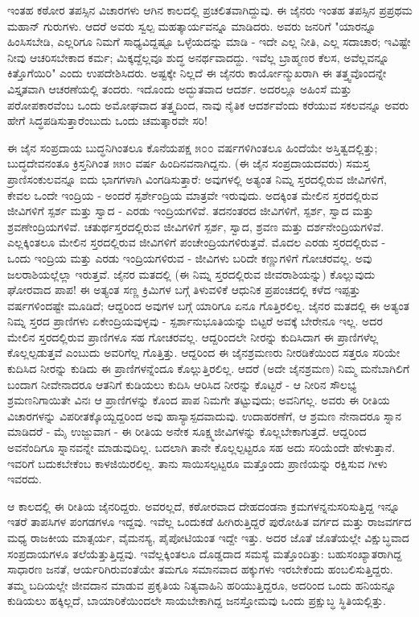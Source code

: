 ಇಂತಹ ಕಠೋರ ತಪಸ್ಸಿನ ವಿಚಾರಗಳು ಆಗಿನ ಕಾಲದಲ್ಲಿ ಪ್ರಚಲಿತವಾಗಿದ್ದುವು. ಈ ಜೈನರು ಇಂತಹ ತಪಸ್ಸಿನ ಪ್ರಪ್ರಥಮ ಮಹಾನ್ ಗುರುಗಳು. ಆದರೆ ಅವರು ಸ್ವಲ್ಪ ಮಹತ್ಕಾರ್ಯವನ್ನೂ ಮಾಡಿದರು. ಅವರು ಜನರಿಗೆ "ಯಾರನ್ನೂ ಹಿಂಸಿಸಬೇಡಿ, ಎಲ್ಲರಿಗೂ ನಿಮಗೆ ಸಾಧ್ಯವಿದ್ದಷ್ಟೂ ಒಳ್ಳೆಯದನ್ನು ಮಾಡಿ - ಇದೇ ಎಲ್ಲ ನೀತಿ, ಎಲ್ಲ ಸದಾಚಾರ; ಇವಿಷ್ಟೇ ನೀವು ಆಚರಿಸಬೇಕಾದ ಕರ್ಮ; ಮಿಕ್ಕದ್ದೆಲ್ಲವೂ ಶುದ್ಧ ಅನರ್ಥವಾದದ್ದು. ಇವೆಲ್ಲ ಬ್ರಾಹ್ಮಣರ ಕೆಲಸ, ಅವೆಲ್ಲವನ್ನೂ ಕಿತ್ತೊಗೆಯಿರಿ" ಎಂದು ಉಪದೇಶಿಸಿದರು. ಅಷ್ಟಕ್ಕೇ ನಿಲ್ಲದೆ ಈ ಜೈನರು ಕಾರ್ಯೋನ್ಮುಖರಾಗಿ ಈ ತತ್ತ್ವವೊಂದನ್ನೇ ವಿಸ್ತೃತವಾಗಿ ಆಚರಣೆಯಲ್ಲಿ ತಂದರು. ಇದೊಂದು ಅದ್ಭುತವಾದ ಆದರ್ಶ. ಅದರಲ್ಲೂ ಅಹಿಂಸೆ ಮತ್ತು ಪರೋಪಕಾರವೆಂಬ ಒಂದು ಅಮೋಘವಾದ ತತ್ತ್ವದಿಂದ, ನಾವು ನೈತಿಕ ಆದರ್ಶವೆಂದು ಕರೆಯುವ ಸಕಲವನ್ನೂ ಅವರು ಹೇಗೆ ಸಿದ್ಧಪಡಿಸುತ್ತಾರೆಂಬುದು ಒಂದು ಚಮತ್ಕಾರವೇ ಸರಿ!

ಈ ಜೈನ ಸಂಪ್ರದಾಯ ಬುದ್ಧನಿಗಿಂತಲೂ ಕೊನೆಯಪಕ್ಷ ೫೦೦ ವರ್ಷಗಳಿಗಿಂತಲೂ ಹಿಂದೆಯೇ ಅಸ್ತಿತ್ವದಲ್ಲಿತ್ತು; ಬುದ್ಧದೇವನಂತೂ ಕ್ರಿಸ್ತನಿಗಿಂತ ೫೫೦ ವರ್ಷ ಹಿಂದಿನವನಾಗಿದ್ದನು. (ಈ ಜೈನ ಸಂಪ್ರದಾಯದವರು) ಸಮಸ್ತ ಪ್ರಾಣಿಸಂಕುಲವನ್ನೂ ಐದು ಭಾಗಗಳಾಗಿ ವಿಂಗಡಿಸುತ್ತಾರೆ: ಅವುಗಳಲ್ಲಿ ಅತ್ಯಂತ ನಿಮ್ನ ಸ್ತರದಲ್ಲಿರುವ ಜೀವಿಗಳಿಗೆ, ಕೇವಲ ಒಂದೇ ಇಂದ್ರಿಯ - ಅಂದರೆ ಸ್ಪರ್ಶೇಂದ್ರಿಯ ಮಾತ್ರವೇ ಇರುವುದು. ಅದಕ್ಕಿಂತ ಮೇಲಿನ ಸ್ತರದಲ್ಲಿರುವ ಜೀವಿಗಳಿಗೆ ಸ್ಪರ್ಶ ಮತ್ತು ಸ್ವಾದ - ಎರಡು ಇಂದ್ರಿಯಗಳಿವೆ. ತದನಂತರದ ಜೀವಿಗಳಿಗೆ, ಸ್ಪರ್ಶ, ಸ್ವಾದ ಮತ್ತು ಶ್ರವಣೇಂದ್ರಿಯಗಳಿವೆ. ಚತುರ್ಥಸ್ತರದಲ್ಲಿರುವ ಜೀವಿಗಳಿಗೆ ಸ್ಪರ್ಶ, ಸ್ವಾದ, ಶ್ರವಣ ಮತ್ತು ದರ್ಶನೇಂದ್ರಿಯಗಳಿವೆ. ಎಲ್ಲಕ್ಕಿಂತಲೂ ಮೇಲಿನ ಸ್ತರದಲ್ಲಿರುವ ಜೀವಿಗಳಿಗೆ ಪಂಚೇಂದ್ರಿಯಗಳಿರುತ್ತವೆ. ಮೊದಲ ಎರಡು ಸ್ತರದಲ್ಲಿರುವ - ಒಂದು ಇಂದ್ರಿಯ ಮತ್ತು ಎರಡು ಇಂದ್ರಿಯಗಳಿರುವ - ಜೀವಿಗಳು ಬರಿದೇ ಕಣ್ಣುಗಳಿಗೆ ಗೋಚರವಲ್ಲ. ಅವು ಜಲರಾಶಿಯಲ್ಲೆಲ್ಲಾ ಇರುತ್ತವೆ. ಜೈನರ ಮತದಲ್ಲಿ (ಈ ನಿಮ್ನ ಸ್ತರದಲ್ಲಿರುವ ಜೀವರಾಶಿಯನ್ನು) ಕೊಲ್ಲುವುದು ಘೋರವಾದ ಪಾಪ! ಈ ಅತ್ಯಂತ ಸಣ್ಣ ಕ್ರಿಮಿಗಳ ಬಗ್ಗೆ ತಿಳುವಳಿಕೆ ಆಧುನಿಕ ಪ್ರಪಂಚದಲ್ಲಿ ಕಳೆದ ಇಪ್ಪತ್ತು ವರ್ಷಗಳಿಂದಷ್ಟೇ ಮೂಡಿದೆ; ಆದ್ದರಿಂದ ಅವುಗಳ ಬಗ್ಗೆ ಯಾರಿಗೂ ಏನೂ ಗೊತ್ತಿರಲಿಲ್ಲ. ಜೈನರ ಮತದಲ್ಲಿ ಈ ಅತ್ಯಂತ ನಿಮ್ನ ಸ್ತರದ ಪ್ರಾಣಿಗಳು ಏಕೇಂದ್ರಿಯವುಳ್ಳವು - ಸ್ಪರ್ಶಾನುಭೂತಿಯನ್ನು ಬಿಟ್ಟರೆ ಅವಕ್ಕೆ ಬೇರೇನೂ ಇಲ್ಲ. ಅದರ ಮೇಲಿನ ಸ್ತರದಲ್ಲಿರುವ ಪ್ರಾಣಿಗಳೂ ಸಹ ಗೋಚರವಲ್ಲ. ಆದ್ದರಿಂದಲೇ ನೀರನ್ನು ಕುದಿಸಿದಾಗ ಈ ಪ್ರಾಣಿಗಳೆಲ್ಲ ಕೊಲ್ಲಲ್ಪಡುತ್ತವೆ ಎಂಬುದು ಅವರಿಗೆಲ್ಲ ಗೊತ್ತಿತ್ತು. ಆದ್ದರಿಂದ ಈ ಜೈನಶ್ರಮಣರು ನೀರಡಿಕೆಯಿಂದ ಸತ್ತರೂ ಸರಿಯೇ ಕುದಿಸಿದ ನೀರನ್ನು ಕುಡಿದು ಈ ಪ್ರಾಣಿಗಳನ್ನೆಂದೂ ಕೊಲ್ಲುತ್ತಿರಲಿಲ್ಲ. ಆದರೆ (ಅದೇ ಜೈನಶ್ರಮಣ) ನಿಮ್ಮ ಮನೆಬಾಗಿಲಿಗೆ ಬಂದಾಗ ನೀವೇನಾದರೂ ಆತನಿಗೆ ಕುಡಿಯಲು ಕುದಿಸಿ ಆರಿಸಿದ ನೀರನ್ನು ಕೊಟ್ಟರೆ - ಆ ನೀರಿನ ಸೌಲಭ್ಯ ಶ್ರಮಣನಿಗಾಯಿತೇ ವಿನಃ ಆ ಪ್ರಾಣಿಗಳನ್ನು ಕೊಂದ ಪಾಪ ನಿಮಗೇ ತಟ್ಟುವುದು; ಅವನಿಗಲ್ಲ. ಅವರು ಈ ರೀತಿಯ ವಿಚಾರಗಳನ್ನು ವಿಪರೀತಕ್ಕೊಯ್ದದ್ದರಿಂದ ಅವು ಹಾಸ್ಯಾಸ್ಪದವಾದುವು. ಉದಾಹರಣೆಗೆ, ಆ ಶ್ರಮಣ ನೇನಾದರೂ ಸ್ನಾನ ಮಾಡಿದರೆ - ಮೈ ಉಜ್ಜುವಾಗ - ಈ ರೀತಿಯ ಅನೇಕ ಸೂಕ್ಷ್ಮಜೀವಿಗಳನ್ನು ಕೊಲ್ಲಬೇಕಾಗುತ್ತದೆ. ಆದ್ದರಿಂದ ಅವನೆಂದಿಗೂ ಸ್ನಾನವನ್ನೇ ಮಾಡುವುದಿಲ್ಲ. ಬದಲಾಗಿ ತಾನೇ ಕೊಲ್ಲಲ್ಪಟ್ಟರೂ ಸಹ ಅದು ಸರಿಯೆಂದೇ ಹೇಳುತ್ತಾನೆ. ಇವರಿಗೆ ಬದುಕಬೇಕೆಂಬ ಕಾಳಜಿಯಿರಲಿಲ್ಲ. ತಾನು ಸಾಯಿಸಲ್ಪಟ್ಟರೂ ಮತ್ತೊಂದು ಪ್ರಾಣಿಯನ್ನು ರಕ್ಷಿಸುವ ಗೀಳು ಇವರದು.

ಆ ಕಾಲದಲ್ಲಿ ಈ ರೀತಿಯ ಜೈನರಿದ್ದರು. ಅವರಲ್ಲದೆ, ಕಠೋರವಾದ ದೇಹದಂಡನಾ ಕ್ರಮಗಳನ್ನನುಸರಿಸುತ್ತಿದ್ದ ಇನ್ನೂ ಇತರೆ ತಾಪಸಿಗಳ ಪಂಗಡಗಳೂ ಇದ್ದವು. ಇವೆಲ್ಲ ಒಂದುಕಡೆ ಹೀಗಿರುತ್ತಿದ್ದರೆ ಪುರೋಹಿತ ವರ್ಗದ ಮತ್ತು ರಾಜವರ್ಗದ ಮಧ್ಯ ರಾಜಕೀಯ ಮಾತ್ಸರ್ಯ, ವೈಮನಸ್ಯ, ಪೈಪೋಟಿಯಂತ ಇದ್ದೇ ಇತ್ತು. ಅದರ ಜೊತೆ ಜೊತೆಯಲ್ಲೇ ವಿಕ್ಷುಬ್ಧವಾದ ಸಂಪ್ರದಾಯಗಳೂ ತಲೆಯೆತ್ತುತ್ತಿದ್ದವು. ಇವೆಲ್ಲಕ್ಕಿಂತಲೂ ದೊಡ್ಡದಾದ ಸಮಸ್ಯೆ ಮತ್ತೊಂದಿತ್ತು: ಬಹುಸಂಖ್ಯಾತರಾಗಿದ್ದ ಸಾಧಾರಣ ಜನತೆ, ಆರ್ಯರಿಗಿರುವಂತೆಯೇ ತಮಗೂ ಸಮಾನವಾದ ಹಕ್ಕುಗಳು ಇರಬೇಕೆಂದು ಹಂಬಲಿಸುತ್ತಿದ್ದರು. ತಮ್ಮ ಬದಿಯಲ್ಲೇ ಜೀವದಾನ ಮಾಡುವ ಪ್ರಕೃತಿಯ ನಿತ್ಯವಾಹಿನಿ ಹರಿಯುತ್ತಿದ್ದರೂ, ಅದರಿಂದ ಒಂದು ಹನಿಯನ್ನೂ ಕುಡಿಯಲು ಹಕ್ಕಿಲ್ಲದೆ, ಬಾಯಾರಿಕೆಯಿಂದಲೇ ಸಾಯಬೇಕಾಗಿದ್ದ ಜನಸ್ತೋಮವು ಒಂದು ಪ್ರಕ್ಷುಬ್ಧ ಸ್ಥಿತಿಯಲ್ಲಿತ್ತು.

